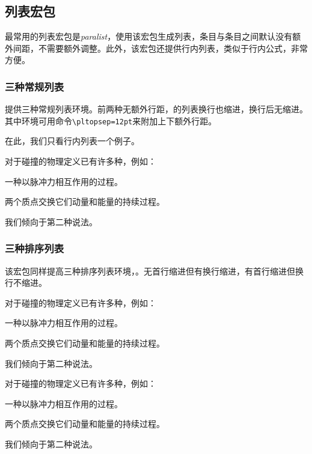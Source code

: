 \subsection{列表宏包}
最常用的列表宏包是\emph{paralist}，使用该宏包生成列表，条目与条目之间默认没有额外间距，不需要额外调整。此外，该宏包还提供行内列表，类似于行内公式，非常方便。

\subsubsection{三种常规列表}
提供三种常规列表环境。前两种无额外行距，的列表换行也缩进，换行后无缩进。其中环境可用命令\verb|\pltopsep=12pt|来附加上下额外行距。

在此，我们只看行内列表一个例子。

\begin{codeshow}
	对于碰撞的物理定义已有许多种，例如：
	\begin{inparaitem}[\S]
		\item 一种以脉冲力相互作用的过程。
		\item 两个质点交换它们动量和能量的持续过程。
	\end{inparaitem}
	我们倾向于第二种说法。
\end{codeshow}

\subsubsection{三种排序列表}
该宏包同样提高三种排序列表环境，。无首行缩进但有换行缩进，有首行缩进但换行不缩进。

\begin{codeshow}
	对于碰撞的物理定义已有许多种，例如：
	\begin{compactenum}[(1)]
		\item 一种以脉冲力相互作用的过程。
		\item 两个质点交换它们动量和能量的持续过程。
	\end{compactenum}
	我们倾向于第二种说法。
\end{codeshow}

\begin{codeshow}
	对于碰撞的物理定义已有许多种，例如：
	\begin{asparaenum}[(1)]
		\item 一种以脉冲力相互作用的过程。
		\item 两个质点交换它们动量和能量的持续过程。
	\end{asparaenum}
	我们倾向于第二种说法。
\end{codeshow}

